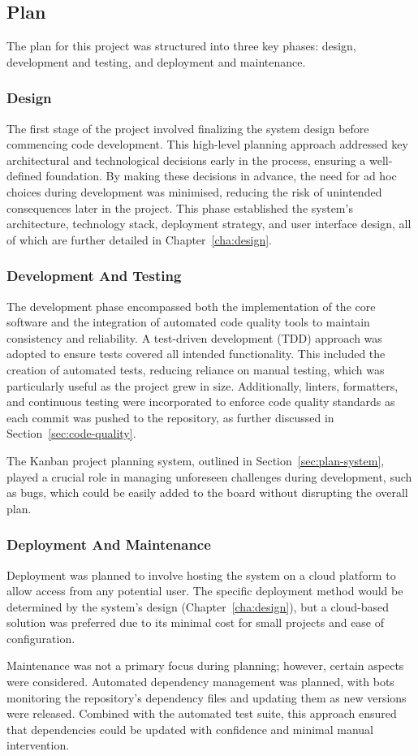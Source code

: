 \subsection{Plan}
The plan for this project was structured into three key phases: design, development and testing, and deployment and maintenance.

\subsubsection{Design}
The first stage of the project involved finalizing the system design before commencing code development. This high-level planning approach addressed key architectural and technological decisions early in the process, ensuring a well-defined foundation. By making these decisions in advance, the need for ad hoc choices during development was minimised, reducing the risk of unintended consequences later in the project. This phase established the system's architecture, technology stack, deployment strategy, and user interface design, all of which are further detailed in Chapter~\ref{cha:design}.

\subsubsection{Development And Testing}
The development phase encompassed both the implementation of the core software and the integration of automated code quality tools to maintain consistency and reliability. A test-driven development (TDD) approach was adopted to ensure tests covered all intended functionality. This included the creation of automated tests, reducing reliance on manual testing, which was particularly useful as the project grew in size. Additionally, linters, formatters, and continuous testing were incorporated to enforce code quality standards as each commit was pushed to the repository, as further discussed in Section~\ref{sec:code-quality}.

The Kanban project planning system, outlined in Section~\ref{sec:plan-system}, played a crucial role in managing unforeseen challenges during development, such as bugs, which could be easily added to the board without disrupting the overall plan.

\subsubsection{Deployment And Maintenance}
Deployment was planned to involve hosting the system on a cloud platform to allow access from any potential user. The specific deployment method would be determined by the system’s design (Chapter~\ref{cha:design}), but a cloud-based solution was preferred due to its minimal cost for small projects and ease of configuration.

Maintenance was not a primary focus during planning; however, certain aspects were considered. Automated dependency management was planned, with bots monitoring the repository’s dependency files and updating them as new versions were released. Combined with the automated test suite, this approach ensured that dependencies could be updated with confidence and minimal manual intervention.
